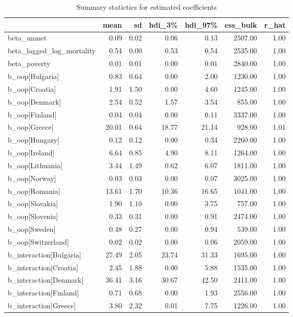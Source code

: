 \documentclass[a4paper,12pt]{article}
\begin{document}
\begin{table}[htbp]
\caption{\label{tab:estimated_coefficients}Summary statictics for estimated coefficients}
\centering
\begin{tabular}{lrrrrrr}
 & mean & sd & hdi\_3\% & hdi\_97\% & ess\_bulk & r\_hat\\
\hline
beta\_unmet & 0.09 & 0.02 & 0.06 & 0.13 & 2507.00 & 1.00\\
beta\_lagged\_log\_mortality & 0.54 & 0.00 & 0.53 & 0.54 & 2535.00 & 1.00\\
beta\_poverty & 0.01 & 0.01 & 0.00 & 0.01 & 2840.00 & 1.00\\
b\_oop[Bulgaria] & 0.83 & 0.64 & 0.00 & 2.00 & 1230.00 & 1.00\\
b\_oop[Croatia] & 1.91 & 1.50 & 0.00 & 4.60 & 1245.00 & 1.00\\
b\_oop[Denmark] & 2.54 & 0.52 & 1.57 & 3.54 & 855.00 & 1.00\\
b\_oop[Finland] & 0.04 & 0.04 & 0.00 & 0.11 & 3337.00 & 1.00\\
b\_oop[Greece] & 20.01 & 0.64 & 18.77 & 21.14 & 928.00 & 1.01\\
b\_oop[Hungary] & 0.12 & 0.12 & 0.00 & 0.34 & 2260.00 & 1.00\\
b\_oop[Ireland] & 6.64 & 0.85 & 4.90 & 8.11 & 1264.00 & 1.00\\
b\_oop[Lithuania] & 3.44 & 1.49 & 0.62 & 6.07 & 1811.00 & 1.00\\
b\_oop[Norway] & 0.03 & 0.03 & 0.00 & 0.07 & 3025.00 & 1.00\\
b\_oop[Romania] & 13.61 & 1.70 & 10.36 & 16.65 & 1041.00 & 1.00\\
b\_oop[Slovakia] & 1.90 & 1.10 & 0.00 & 3.75 & 757.00 & 1.00\\
b\_oop[Slovenia] & 0.33 & 0.31 & 0.00 & 0.91 & 2474.00 & 1.00\\
b\_oop[Sweden] & 0.48 & 0.27 & 0.00 & 0.94 & 539.00 & 1.00\\
b\_oop[Switzerland] & 0.02 & 0.02 & 0.00 & 0.06 & 2059.00 & 1.00\\
b\_interaction[Bulgaria] & 27.49 & 2.05 & 23.74 & 31.33 & 1695.00 & 1.00\\
b\_interaction[Croatia] & 2.45 & 1.88 & 0.00 & 5.88 & 1535.00 & 1.00\\
b\_interaction[Denmark] & 36.41 & 3.16 & 30.67 & 42.50 & 2411.00 & 1.00\\
b\_interaction[Finland] & 0.71 & 0.68 & 0.00 & 1.93 & 2556.00 & 1.00\\
b\_interaction[Greece] & 3.80 & 2.32 & 0.01 & 7.75 & 1226.00 & 1.00\\

\end{tabular}
\end{table}
\end{document}
